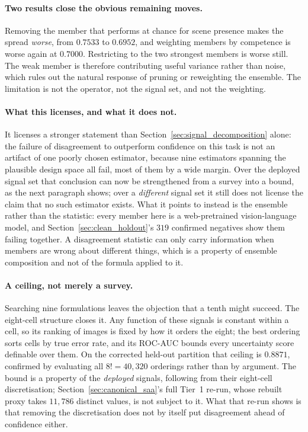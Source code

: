 \documentclass[12pt,a4paper]{report}
\begin{document}
\paragraph{Two results close the obvious remaining moves.} Removing the member that performs at
chance for scene presence makes the spread \emph{worse}, from $0.7533$ to $0.6952$, and weighting
members by competence is worse again at $0.7000$. Restricting to the two strongest members is
worse still. The weak member is therefore contributing useful variance rather than noise, which
rules out the natural response of pruning or reweighting the ensemble. The limitation is not the
operator, not the signal set, and not the weighting.

\paragraph{What this licenses, and what it does not.} It licenses a stronger statement than
Section~\ref{sec:signal_decomposition} alone: the failure of disagreement to outperform confidence
on this task is not an artifact of one poorly chosen estimator, because nine estimators spanning
the plausible design space all fail, most of them by a wide margin. Over the deployed signal set
that conclusion can now be strengthened from a survey into a bound, as the next paragraph shows;
over a \emph{different} signal set it still does not license the claim that no such estimator
exists. What it points to instead is the ensemble rather than the
statistic: every member here is a web-pretrained vision-language model, and
Section~\ref{sec:clean_holdout}'s $319$ confirmed negatives show them failing together. A
disagreement statistic can only carry information when members are wrong about different things,
which is a property of ensemble composition and not of the formula applied to it.

\paragraph{A ceiling, not merely a survey.} Searching nine formulations leaves the objection that a
tenth might succeed. The eight-cell structure closes it. Any function of these signals is constant
within a cell, so its ranking of images is fixed by how it orders the eight; the best ordering
sorts cells by true error rate, and its ROC-AUC bounds every uncertainty score definable over
them. On the corrected held-out partition that ceiling is $\mathbf{0.8871}$, confirmed by
evaluating all $8! = 40{,}320$ orderings rather than by argument. The bound is a property of
the \emph{deployed} signals, following from their eight-cell discretisation;
Section~\ref{sec:canonical_saa}'s full Tier~1 re-run, whose rebuilt proxy takes $11{,}786$
distinct values, is not subject to it. What that re-run shows is that removing the
discretisation does not by itself put disagreement ahead of confidence either.
\end{document}
